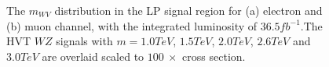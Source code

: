 \begin{figure}[h]
	\centering
	\caption{The $m_{WV}$ distribution in the LP signal region for (a) electron and (b) muon channel, with the integrated luminosity of $36.5fb^{-1}$.The HVT $WZ$ signals with $m=1.0TeV$, $1.5TeV$, $2.0TeV$, $2.6TeV$ and $3.0TeV$ are overlaid 
	scaled to $100 ~\times$ cross section.}
	\label{Fig:LowPuritySR}
\end{figure}
%

